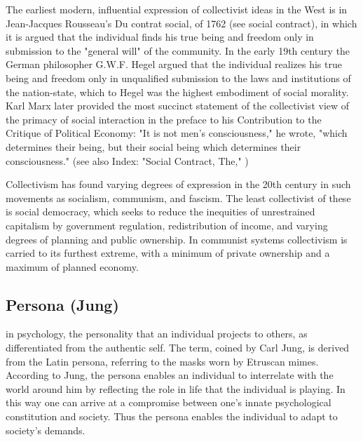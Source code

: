 \documentclass[12pt]{article}
\begin{document}
                                      The earliest modern, influential expression of collectivist ideas in
                                      the West is in Jean-Jacques Rousseau's Du contrat social, of 1762
                                      (see social contract), in which it is argued that the individual finds
                                      his true being and freedom only in submission to the "general will" of
                                      the community. In the early 19th century the German philosopher
                                      G.W.F. Hegel argued that the individual realizes his true being and
                                      freedom only in unqualified submission to the laws and institutions
                                      of the nation-state, which to Hegel was the highest embodiment of
                                      social morality. Karl Marx later provided the most succinct statement
                                      of the collectivist view of the primacy of social interaction in the
                                      preface to his Contribution to the Critique of Political Economy: "It
                                      is not men's consciousness," he wrote, "which determines their being,
                                      but their social being which determines their consciousness." (see
                                      also Index: "Social Contract, The," ) 

                                      Collectivism has found varying degrees of expression in the 20th
                                      century in such movements as socialism, communism, and fascism.
                                      The least collectivist of these is social democracy, which seeks to
                                      reduce the inequities of unrestrained capitalism by government
                                      regulation, redistribution of income, and varying degrees of planning
                                      and public ownership. In communist systems collectivism is carried
                                      to its furthest extreme, with a minimum of private ownership and a
                                      maximum of planned economy. 


\subsection{Persona (Jung)}
in psychology, the personality that an individual projects to others,
as differentiated from the authentic self. The term, coined by Carl
Jung, is derived from the Latin persona, referring to the masks worn
by Etruscan mimes. According to Jung, the persona enables an
individual to interrelate with the world around him by reflecting the
role in life that the individual is playing. In this way one can arrive at
a compromise between one's innate psychological constitution and
society. Thus the persona enables the individual to adapt to society's
demands. 
\end{document}
